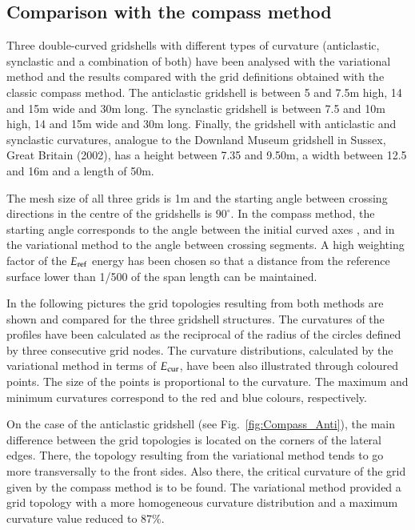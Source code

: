 \documentclass[Thesis.tex]{subfiles}
\begin{document}
\subsection{Comparison with the compass method}
Three double-curved gridshells with different types of curvature (anticlastic, synclastic and a combination of both) have been analysed with the variational method and the results compared with the grid definitions obtained with the classic compass method. The anticlastic gridshell is between 5 and 7.5m high, 14 and 15m wide and 30m long. The synclastic gridshell is between 7.5 and 10m high, 14 and 15m wide and 30m long. Finally, the gridshell with anticlastic and synclastic curvatures, analogue to the Downland Museum gridshell in Sussex, Great Britain (2002), has a height between 7.35 and 9.50m, a width between 12.5 and 16m and a length of 50m. 

The mesh size of all three grids is 1m and the starting angle between crossing directions in the centre of the gridshells is $90^\circ$. In the compass method, the starting angle corresponds to the angle between the initial curved axes \cite{IL1974}, and in the variational method to the angle between crossing segments. A high weighting factor of the $E_{\textrm{\scriptsize{ref}}}$ energy has been chosen so that a distance from the reference surface lower than 1/500 of the span length can be maintained.

In the following pictures the grid topologies resulting from both methods are shown and compared for the three gridshell structures. The curvatures of the profiles have been calculated as the reciprocal of the radius of the circles defined by three consecutive grid nodes. The curvature distributions, calculated by the variational method in terms of $E_{\textrm{\scriptsize{cur}}}$, have been also illustrated through coloured points. The size of the points is proportional to the curvature. The maximum and minimum curvatures correspond to the red and blue colours, respectively.

On the case of the anticlastic gridshell (see Fig.~\ref{fig:Compass_Anti}), the main difference between the grid topologies is located on the corners of the lateral edges. There, the topology resulting from the variational method tends to go more transversally to the front sides. Also there, the critical curvature of the grid given by the compass method is to be found. The variational method provided a grid topology with a more homogeneous curvature distribution and a maximum curvature value reduced to 87\%.
\end{document}
